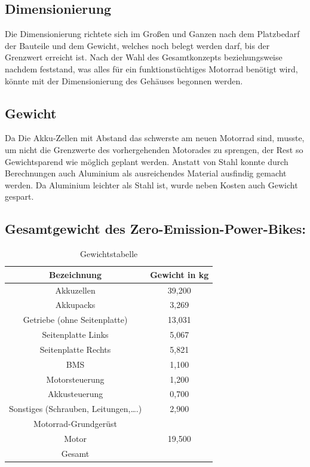 \newpage

\subsection{Dimensionierung}
Die Dimensionierung richtete sich im Großen und Ganzen nach dem Platzbedarf der Bauteile und dem Gewicht, welches noch belegt werden darf, bis der Grenzwert erreicht ist. Nach der Wahl des Gesamtkonzepts beziehungsweise nachdem feststand, was alles für ein funktionstüchtiges Motorrad benötigt wird, könnte mit der Dimensionierung des Gehäuses begonnen werden. 

\subsection{Gewicht}
Da Die Akku-Zellen mit Abstand das schwerste am neuen Motorrad sind, musste, um nicht die Grenzwerte des vorhergehenden Motorades zu sprengen, der Rest so Gewichtsparend wie möglich geplant werden. Anstatt von Stahl konnte durch Berechnungen auch Aluminium als ausreichendes Material ausfindig gemacht werden. Da Aluminium leichter als Stahl ist, wurde neben Kosten auch Gewicht gespart. 

\subsection{Gesamtgewicht des Zero-Emission-Power-Bikes:}
\begin{table} [H]
	\begin{center}
		\begin{tabular}{|c|c|}
		\hline
		Bezeichnung 					& Gewicht in kg \\ \hline
		Akkuzellen  					& 39,200        \\ \hline
		Akkupacks   					& 3,269         \\ \hline
		Getriebe (ohne Seitenplatte)    & 13,031  		\\ \hline   
		Seitenplatte Links				& 5,067			\\ \hline
		Seitenplatte Rechts				& 5,821			\\ \hline
		BMS								& 1,100			\\ \hline
		Motorsteuerung					& 1,200			\\ \hline
		Akkusteuerung					& 0,700			\\ \hline
		Sonstiges (Schrauben, Leitungen,….) & 2,900		\\ \hline
		Motorrad-Grundgerüst			&				\\ \hline
		Motor							& 19,500		\\ \hline
		Gesamt							&				\\ \hline
		\end{tabular}
		\caption{Gewichtstabelle}
	\end{center}
\end{table}


